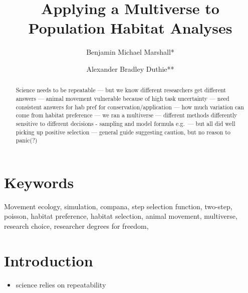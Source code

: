 \documentclass[10pt,a4paper]{article}
\providecommand{\tightlist}{%
  \setlength{\itemsep}{0pt}\setlength{\parskip}{0pt}}
\begin{document}
\pagestyle{fancy}

\title{Applying a Multiverse to Population Habitat Analyses}
\author[1]{Benjamin Michael Marshall*}
\author[1]{Alexander Bradley Duthie**}


\maketitle
\thispagestyle{fancy}

\begin{abstract}

Science needs to be repeatable --- but we know different researchers get different answers --- animal movement vulnerable because of high task uncertainty --- need consistent answers for hab pref for conservation/application --- how much variation can come from habitat preference --- we ran a multiverse --- different methods differently sensitive to different decisions - sampling and model formula e.g.~--- but all did well picking up positive selection --- general guide suggesting caution, but no reason to panic(?)

\end{abstract}

\section*{Keywords}

Movement ecology, simulation, compana, step selection function, two-step, poisson, habitat preference, habitat selection, animal movement, multiverse, research choice, researcher degrees for freedom,

\clearpage
\pagestyle{fancy}

\section{Introduction}\label{introduction}

\begin{itemize}
\tightlist
\item
  science relies on repeatability
\end{itemize}
\end{document}
